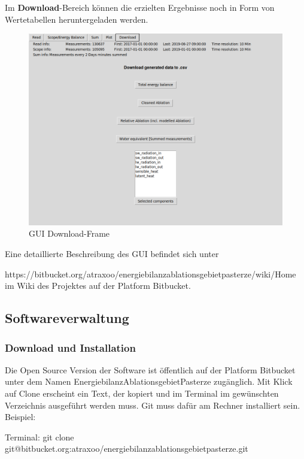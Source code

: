 \documentclass[12pt,a4paper]{article}
\begin{document}
Im \textbf{Download}-Bereich können die erzielten Ergebnisse noch in Form von Wertetabellen heruntergeladen werden.

\begin{figure}[H]
\centering
\includegraphics[width=1\textwidth]{pictures/GUI/Download_Frame.png}
\caption{GUI Download-Frame}
\label{fig:GUI Download-Frame}
\end{figure}

Eine detaillierte Beschreibung des GUI befindet sich unter

\textsf{\small https://bitbucket.org/atraxoo/energiebilanzablationsgebietpasterze/wiki/Home}
 im Wiki des Projektes auf der Platform Bitbucket.


\subsection{Softwareverwaltung}
\subsubsection{Download und Installation}
Die Open Source Version der Software ist öffentlich auf der  Platform Bitbucket unter dem Namen EnergiebilanzAblationsgebietPasterze zugänglich. Mit Klick auf Clone erscheint ein Text, der kopiert und im Terminal im gewünschten Verzeichnis ausgeführt werden muss. Git muss dafür am Rechner installiert sein.\\

Beispiel:

Terminal: \textsf{\small git clone git@bitbucket.org:atraxoo/energiebilanzablationsgebietpasterze.git}\\
\end{document}
